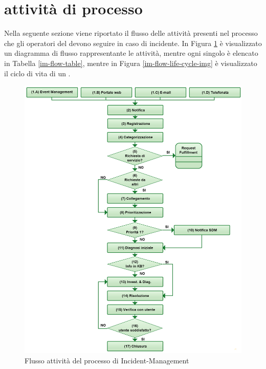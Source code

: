 %
%
\section[Attività di processo]{attività di processo}
\label{im-flow}
Nella seguente sezione viene riportato il flusso delle attività presenti nel processo che gli operatori del  devono seguire in caso di incidente. In Figura \ref{im-flow-img} è visualizzato un diagramma di flusso rappresentante le attività, mentre ogni singolo  è elencato in Tabella \ref{im-flow-table}, mentre in Figura \ref{im-flow-life-cycle-img} è visualizzato il ciclo di vita di un .

\begin{figure}[htbp]
\centering
\includegraphics[scale=0.3]{Images/Diagrams/Incident_Management.png}
\caption{Flusso attività del processo di \ac{Incident-Management}}
\label{im-flow-img}
\end{figure}

